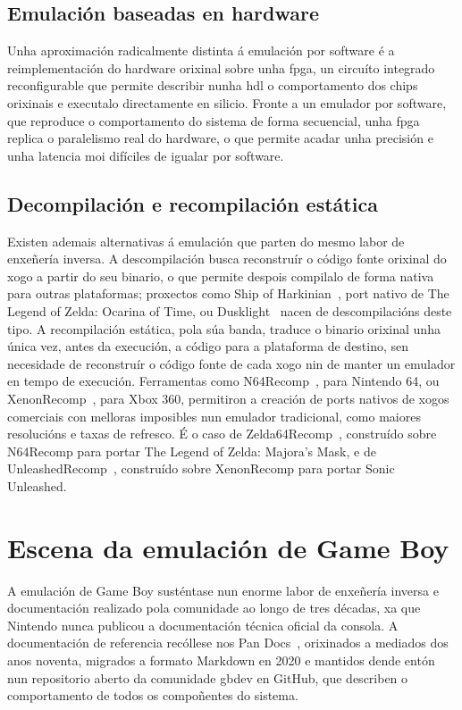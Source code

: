 \subsection{Emulación baseadas en hardware}
\label{subsec:emulacion-hardware}
Unha aproximación radicalmente distinta á emulación por software
é a reimplementación do hardware orixinal sobre unha \acrfull{fpga},
un circuíto integrado reconfigurable que permite describir nunha \acrfull{hdl}
o comportamento dos chips orixinais e executalo directamente en silicio.
Fronte a un emulador por software, que reproduce o comportamento do sistema
de forma secuencial, unha \acrshort{fpga} replica o paralelismo real do hardware,
o que permite acadar unha precisión e unha latencia moi difíciles de igualar por software.


\subsection{Decompilación e recompilación estática}
Existen ademais alternativas á emulación que parten do mesmo labor de enxeñería inversa.
A descompilación busca reconstruír o código fonte orixinal do xogo a partir do seu binario,
o que permite despois compilalo de forma nativa para outras plataformas;
proxectos como Ship of Harkinian~\cite{ShipOfHarkinian},
port nativo de The Legend of Zelda: Ocarina of Time,
ou Dusklight~\cite{Dusklight}
nacen de descompilacións deste tipo.
A recompilación estática, pola súa banda, traduce o binario orixinal unha única vez,
antes da execución, a código para a plataforma de destino,
sen necesidade de reconstruír o código fonte de cada xogo nin de manter un emulador en tempo de execución.
Ferramentas como N64Recomp~\cite{N64Recomp},
para Nintendo 64, ou XenonRecomp~\cite{XenonRecomp},
para Xbox 360, permitiron a creación de ports nativos de xogos comerciais con melloras
imposibles nun emulador tradicional, como maiores resolucións e taxas de refresco.
É o caso de Zelda64Recomp~\cite{Zelda64Recomp},
construído sobre N64Recomp para portar The Legend of Zelda: Majora's Mask,
e de UnleashedRecomp~\cite{UnleashedRecomp},
construído sobre XenonRecomp para portar Sonic Unleashed.

\section{Escena da emulación de Game Boy}

A emulación de Game Boy susténtase nun enorme labor de enxeñería inversa e documentación
realizado pola comunidade ao longo de tres décadas, xa que Nintendo nunca publicou
a documentación técnica oficial da consola.
A documentación de referencia recóllese nos Pan Docs~\cite{pandocs},
orixinados a mediados dos anos noventa,
migrados a formato Markdown en 2020 e mantidos dende entón nun repositorio aberto
da comunidade gbdev en GitHub, que describen o comportamento de todos os compoñentes do sistema.


